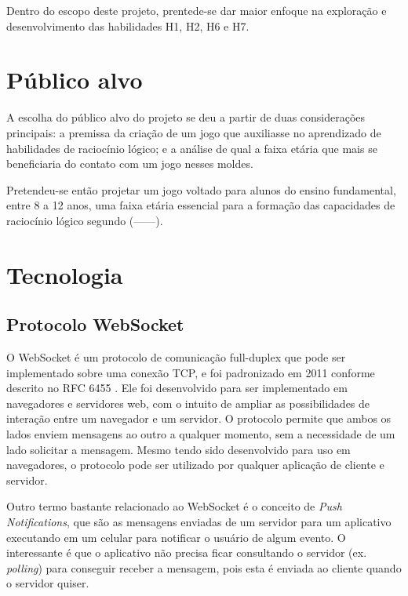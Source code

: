 Dentro do escopo deste projeto, prentede-se dar maior enfoque na exploração e
desenvolvimento das habilidades H1, H2, H6 e H7.


\section{Público alvo}\label{sec-publico-alvo}

A escolha do público alvo do projeto se deu a partir de duas considerações
principais: a premissa da criação de um jogo que auxiliasse no aprendizado 
de habilidades de raciocínio lógico; e a análise de qual a faixa etária que 
mais se beneficiaria do contato com um jogo nesses moldes.

Pretendeu-se então projetar um jogo voltado para alunos do ensino fundamental, 
entre 8 a 12 anos, uma faixa etária essencial para a formação das capacidades 
de raciocínio lógico segundo (------).


\section{Tecnologia}\label{sec-tecnologia}

\subsection{Protocolo WebSocket}\label{subsec-teo-websocket}

O WebSocket é um protocolo de comunicação full-duplex que pode ser implementado
sobre uma conexão TCP, e foi padronizado em 2011 conforme descrito no RFC 6455
\cite{RFC:2011:websocket}. Ele foi desenvolvido para ser implementado em 
navegadores e servidores web, com o intuito de ampliar as possibilidades de
interação entre um navegador e um servidor. O protocolo permite que ambos os 
lados enviem mensagens ao outro a qualquer momento, sem a necessidade de um 
lado solicitar a mensagem. Mesmo tendo sido desenvolvido para uso em navegadores, 
o protocolo pode ser utilizado por qualquer aplicação de cliente e servidor.

Outro termo bastante relacionado ao WebSocket é o conceito de 
\textit{Push Notifications}, que são as mensagens enviadas de um servidor para 
um aplicativo executando em um celular para notificar o usuário de algum evento. 
O interessante é que o aplicativo não precisa ficar consultando o servidor 
(ex. \textit{polling}) para conseguir receber a mensagem, pois esta é enviada 
ao cliente quando o servidor quiser.

